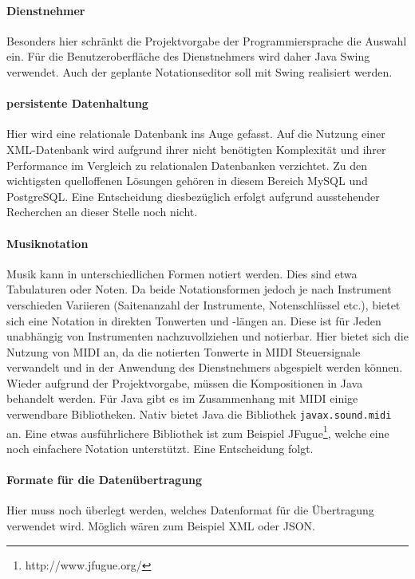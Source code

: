 \documentclass[12pt]{scrartcl}
\begin{document}
\paragraph*{Dienstnehmer}
Besonders hier schränkt die Projektvorgabe der Programmiersprache die Auswahl ein. Für die Benutzeroberfläche des Dienstnehmers wird daher Java Swing verwendet. Auch der geplante Notationseditor soll mit Swing realisiert werden.

\paragraph*{persistente Datenhaltung}
Hier wird eine relationale Datenbank ins Auge gefasst. Auf die Nutzung einer XML-Datenbank wird aufgrund ihrer nicht benötigten Komplexität und ihrer Performance im Vergleich zu relationalen Datenbanken verzichtet. Zu den wichtigsten quelloffenen Lösungen gehören in diesem Bereich MySQL und PostgreSQL. Eine Entscheidung diesbezüglich erfolgt aufgrund ausstehender Recherchen an dieser Stelle noch nicht.

\paragraph*{Musiknotation}
Musik kann in unterschiedlichen Formen notiert werden. Dies sind etwa Tabulaturen oder Noten. Da beide Notationsformen jedoch je nach Instrument verschieden Variieren (Saitenanzahl der Instrumente, Notenschlüssel etc.), bietet sich eine Notation in direkten Tonwerten und -längen an. Diese ist für Jeden unabhängig von Instrumenten nachzuvollziehen und notierbar. Hier bietet sich die Nutzung von MIDI an, da die notierten Tonwerte in MIDI Steuersignale verwandelt und in der Anwendung des Dienstnehmers abgespielt werden können. Wieder aufgrund der Projektvorgabe, müssen die Kompositionen in Java behandelt werden. Für Java gibt es im Zusammenhang mit MIDI einige verwendbare Bibliotheken. Nativ bietet Java die Bibliothek \texttt{javax.sound.midi} an. Eine etwas ausführlichere Bibliothek ist zum Beispiel JFugue\footnote{http://www.jfugue.org/}, welche eine noch einfachere Notation unterstützt. Eine Entscheidung folgt.

\paragraph*{Formate für die Datenübertragung}
Hier muss noch überlegt werden, welches Datenformat für die Übertragung verwendet wird. Möglich wären zum Beispiel XML oder JSON.
\end{document}
